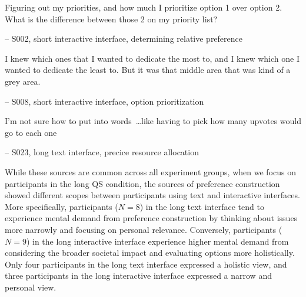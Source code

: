 \begin{displayquote}
Figuring out my priorities, and how much I prioritize option 1 over option 2. What is the difference between those 2 on my priority list?

\hfill -- S002, short interactive interface, determining relative preference
\end{displayquote}


\begin{displayquote}
I knew which ones that I wanted to dedicate the most to, and I knew which one I wanted to dedicate the least to. But it was that middle area that was kind of a grey area.
    
\noindent \hfill -- S008, short interactive interface, option prioritization
\end{displayquote}


\begin{displayquote}
I'm not sure how to put into words~\ldots like having to pick how many upvotes would go to each one
    
\noindent \hfill -- S023, long text interface, precice resource allocation
\end{displayquote}

While these sources are common across all experiment groups, when we focus on participants in the long QS condition, the sources of preference construction showed different scopes between participants using text and interactive interfaces. More specifically, participants ($N=8$) in the long text interface tend to experience mental demand from preference construction by thinking about issues more narrowly and focusing on personal relevance. Conversely, participants ($N=9$) in the long interactive interface experience higher mental demand from considering the broader societal impact and evaluating options more holistically. Only four participants in the long text interface expressed a holistic view, and three participants in the long interactive interface expressed a narrow and personal view.

    
